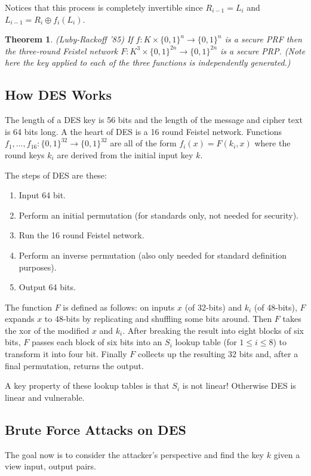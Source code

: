 \documentclass[twoside]{article}
\newcounter{lecnum}
\newtheorem{theorem}{Theorem}[lecnum]
\begin{document}
Notices that this process is completely invertible since $R_{i-1} = L_{i}$ and $ L_{i-1} = R_{i} \oplus f_{i}(L_{i})$.

\begin{theorem}
(Luby-Rackoff '85) If $f: K \times \{0,1\}^n \rightarrow \{0,1\}^n$ is a secure PRF then the three-round Feistel network $F: K^3 \times \{0,1\}^{2n} \rightarrow \{0,1\}^{2n}$ is a secure PRP. (Note here the key applied to each of the three functions is independently generated.)
\end{theorem}

\subsection{How DES Works}
The length of a DES key is 56 bits and the length of the message and cipher text is 64 bits long. A the heart of DES is a 16 round Feistel network. Functions $f_1, ..., f_{16}: \{0,1\}^{32} \rightarrow \{0,1\}^{32}$ are all of the form $f_i(x) = F(k_i, x)$ where the round keys $k_i$ are derived from the initial input key $k$. 

The steps of DES are these:
\begin{enumerate}
\item Input 64 bit.
\item Perform an initial permutation (for standards only, not needed for security).
\item Run the 16 round Feistel network.
\item Perform an inverse permutation (also only needed for standard definition purposes).
\item Output 64 bits.
\end{enumerate}

The function $F$ is defined as follows: on inputs $x$ (of 32-bits) and $k_i$ (of 48-bits), $F$ expands $x$ to 48-bits by replicating and shuffling some bits around. Then $F$ takes the xor of the modified $x$ and $k_i$. After breaking the result into eight blocks of six bits, $F$ passes each block of six bits into an $S_i$ lookup table (for $1 \leq i \leq 8$) to transform it into four bit. Finally $F$ collects up the resulting 32 bits and, after a final permutation, returns the output.

A key property of these lookup tables is that $S_i$ is not linear! Otherwise DES is linear and vulnerable.

\subsection{Brute Force Attacks on DES}
The goal now is to consider the attacker's perspective and find the key $k$ given a view input, output pairs.
\end{document}
